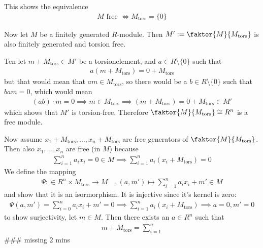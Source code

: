 This shows the equivalence
\begin{align*}
	M \text{ free } \iff M_{\text{tors}} = \{0\}
\end{align*} 


Now let $M$ be a finitely generated $R$-module. Then $M' := \faktor{M}{M_{\text{tors}}}$ is also finitely generated and torsion free.

Ten let $m + M_{\text{tors}} \in M'$ be a torsionelement, and $a \in R \setminus \{0\}$ such that
\begin{align*}
	a(m + M_{\text{tors}}) = 0 + M_{\text{tors}}
\end{align*}
but that would mean that $am \in M_{\text{tors}}$, so there would be a $b \in R \setminus \{0\}$ such that $bam = 0$, which would mean
\begin{align*}
	(ab) \cdot m = 0 \implies m \in M_{\text{tors}} \implies (m + M_{\text{tors}}) = 0 + M_{\text{tors}} \in M'
\end{align*}
which shows that $M'$ is torsion-free. Therefore $\faktor{M}{M_{\text{tors}}} \iso R^{n}$ is a free module.


Now assume $x_1 + M_{\text{tors}}, \ldots, x_n + M_{\text{tors}}$ are free generators of $\faktor{M}{M_{\text{tors}}}$.
Then also $x_{1}, \ldots, x_{n}$ are free (in $M$) because
\begin{align*}
	\sum_{i = 1}^{n}a_ix_i = 0 \in M \implies \sum_{i=1}^{n}a_i(x_i + M_{\text{tors}}) = 0
\end{align*}
We define the mapping
\begin{align*}
	\Psi: \in R^{n} \times M_{\text{tors}} \to M \quad, (a,m') \mapsto \sum_{i=1}^{n}a_ix_i + m' \in M
\end{align*}
and show that it is an isormorphism.
It is injective since it's kernel is zero:
\begin{align*}
	\Psi(a,m') = \sum_{i=0}^{n}a_ix_i + m' = 0 \implies \sum_{i=1}^{n}a_i(x_i + M_{\text{tors}}) \implies a = 0, m' = 0
\end{align*}
to show surjectivity, let $m \in M$. Then there exists an $a \in R^{n}$ such that
\begin{align*}
	m + M_{\text{tors}} = \sum_{i = 1}^{n}
\end{align*}
\#\#\# missing 2 mins
